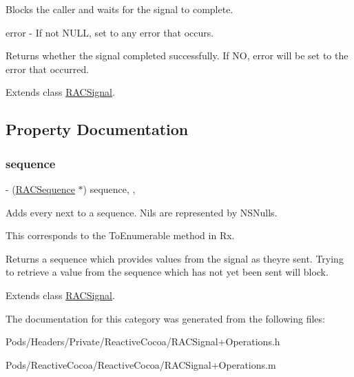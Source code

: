 Blocks the caller and waits for the signal to complete.

error -\/ If not N\+U\+LL, set to any error that occurs.

Returns whether the signal completed successfully. If NO, {\ttfamily error} will be set to the error that occurred. 

Extends class \mbox{\hyperlink{interface_r_a_c_signal_af4c476fc335ca830841bd4fd267f05ce}{R\+A\+C\+Signal}}.



\subsection{Property Documentation}
\mbox{\label{category_r_a_c_signal_07_operations_08_ae580a10328d7f204c456068a2bfb5e1b}} 
\subsubsection{\texorpdfstring{sequence}{sequence}}
{\footnotesize\ttfamily -\/ (\mbox{\hyperlink{interface_r_a_c_sequence}{R\+A\+C\+Sequence}} $\ast$) sequence\hspace{0.3cm}{\ttfamily [read]}, {\ttfamily [nonatomic]}, {\ttfamily [strong]}}

Adds every {\ttfamily next} to a sequence. Nils are represented by N\+S\+Nulls.

This corresponds to the {\ttfamily To\+Enumerable} method in Rx.

Returns a sequence which provides values from the signal as they\textquotesingle{}re sent. Trying to retrieve a value from the sequence which has not yet been sent will block. 

Extends class \mbox{\hyperlink{interface_r_a_c_signal_ae580a10328d7f204c456068a2bfb5e1b}{R\+A\+C\+Signal}}.



The documentation for this category was generated from the following files\+:\begin{DoxyCompactItemize}
\item 
Pods/\+Headers/\+Private/\+Reactive\+Cocoa/R\+A\+C\+Signal+\+Operations.\+h\item 
Pods/\+Reactive\+Cocoa/\+Reactive\+Cocoa/R\+A\+C\+Signal+\+Operations.\+m\end{DoxyCompactItemize}
